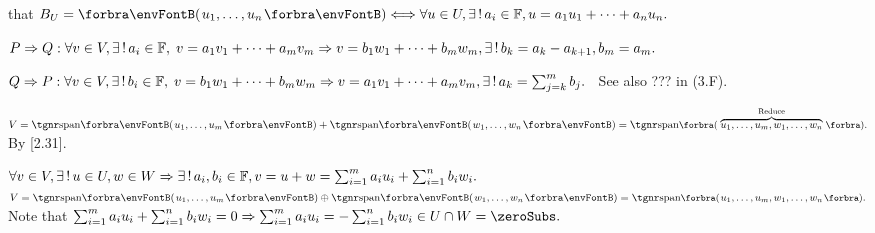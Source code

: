 \NOTICE that $B_U=\Par{u_1,\dots,u_n}\Longleftrightarrow\forall u\in U,\exists\,!\,a_i\in\Fbb,u=a_1 u_1+\dots+a_n u_n.$\par\quad
$P\Rightarrow Q:\forall v\in V,\exists\,!\,a_i\in{\mathbb{F}},\;v=a_1 v_1+\dots+a_m v_m\Rightarrow v=b_1 w_1+\dots+b_m w_m,\exists\,!\,b_k=a_k-a_{k+1},b_m=a_m.$\vspace{2pt}\par\quad
$Q\Rightarrow P:\forall v\in V,\exists\,!\,b_i\in{\mathbb{F}},\;v=b_1w_1+\dots+b_mw_m\Rightarrow v=a_1v_1+\dots+a_mv_m,\exists\,!\,a_k=\sum_{j=k}^m b_j.$\PfEnd\vspace{2pt}\quad
\Comment \,\,\,See also ??? in (3.F).\vspace{-2pt}%
\SepLine\pagebreak

$V=\Span{u_1,\dots,u_m}+\Span{w_1,\dots,w_n}=\Span[\BigPar]{\overbrace{u_1,\dots,u_m,w_1,\dots,w_n}^{\text{Reduce}}}.$ By [2.31].\PfEnd
\SepLine

$\forall v\in V,\exists\,!\,u\in U,w\in W\Rightarrow\exists\,!\,a_i,b_i\in{\mathbb{F}},v=u+w=\sum_{i=1}^ma_iu_i+\sum_{i=1}^nb_iw_i.$\parSol{}
\Or\;$V=\Span{u_1,\dots,u_m}\oplus\Span{w_1,\dots,w_n}=\Span[\BigPar]{u_1,\dots,u_m,w_1,\dots,w_n}.$\parSol{\vspace{2pt}}
\Blind{\Or\;}Note that $\sum_{i=1}^ma_iu_i+\sum_{i=1}^nb_iw_i=0\Rightarrow\sum_{i=1}^ma_iu_i=-\sum_{i=1}^nb_iw_i\in U\cap W=\zeroSubs.$\PfEnd
\SepLine

